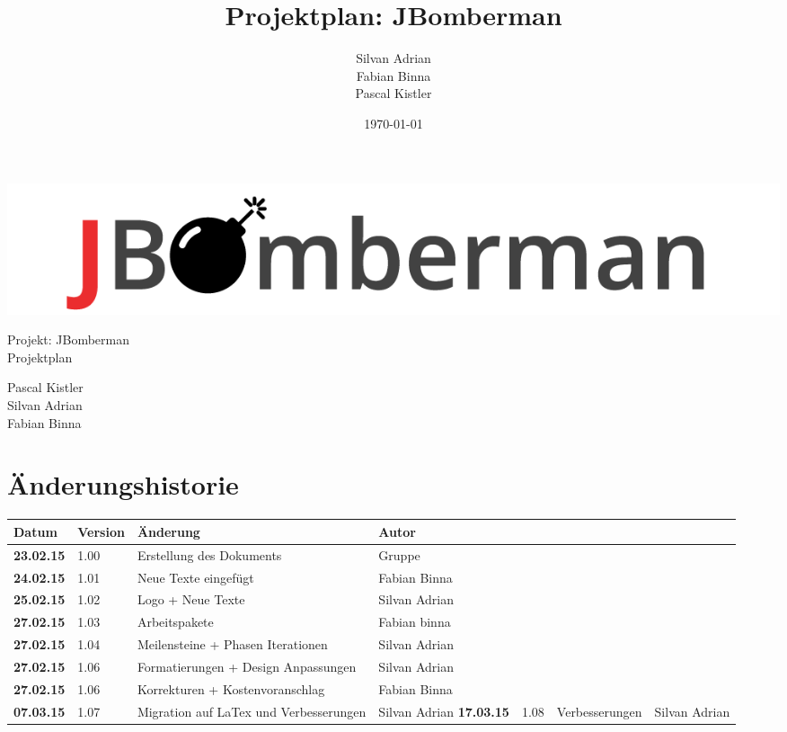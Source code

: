 \documentclass[11pt]{scrartcl}
\title{Projektplan: JBomberman}
\author{Silvan Adrian \\ Fabian Binna \\ Pascal Kistler}
\date{\today{}}
\begin{document}
\def\arraystretch{1.5}
\begin{titlepage}
\begin{center}
\vspace{10em}
\includegraphics[scale=2]{jbomberman}
\vspace{10em}
\end{center}
\begin{center}
\huge {Projekt: JBomberman} \\
\huge {Projektplan}
\end{center}
\begin{center}
\vspace{10em}
\LARGE {Pascal Kistler} \\
\LARGE {Silvan Adrian} \\
\LARGE {Fabian Binna}
\end{center}

\end{titlepage}

\newpage
\section{Änderungshistorie}
\label{sec:Änderungen}

\begin{tabularx}{\linewidth}{l l l l}
\textbf{Datum} & \textbf{Version} & \textbf{Änderung}  & \textbf{Autor} \\
\hline
\textbf{23.02.15} & 1.00 & Erstellung des Dokuments & Gruppe \\
\textbf{24.02.15} & 1.01 & Neue Texte eingefügt & Fabian Binna \\
\textbf{25.02.15} & 1.02 & Logo + Neue Texte & Silvan Adrian \\
\textbf{27.02.15} & 1.03 & Arbeitspakete & Fabian binna \\
\textbf{27.02.15} & 1.04 & Meilensteine + Phasen Iterationen & Silvan Adrian \\
\textbf{27.02.15} & 1.06 & Formatierungen + Design Anpassungen & Silvan Adrian \\
\textbf{27.02.15} & 1.06 & Korrekturen + Kostenvoranschlag & Fabian Binna \\
\textbf{07.03.15} & 1.07 & Migration auf LaTex und Verbesserungen & Silvan Adrian
\textbf{17.03.15} & 1.08 & Verbesserungen & Silvan Adrian
\end{tabularx}
\end{document}
